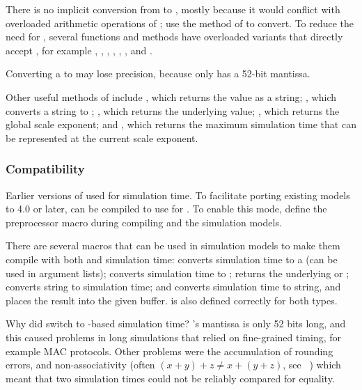 There is no implicit conversion from  to , mostly
because it would conflict with overloaded arithmetic operations of ;
use the  method of  to convert. To reduce the
need for , several functions and methods have overloaded variants
that directly accept , for example , ,
, , , , and
.

\begin{note}
   Converting a  to  may lose precision, because
    only has a 52-bit mantissa.
\end{note}

Other useful methods of  include ,
which returns the value as a string; , which converts a
string to ; , which returns the
underlying  value; , which returns the
global scale exponent; and , which returns the
maximum simulation time that can be represented at the current
scale exponent.

\subsubsection{Compatibility}

Earlier versions of {\opp} used  for simulation time. To facilitate
porting existing models to {\opp} 4.0 or later, {\opp} can be compiled to use
 for . To enable this mode, define the
 preprocessor macro during compiling {\opp}
and the simulation models.

There are several macros that can be used in simulation models to make
them compile with both  and  simulation time:
 converts simulation time to a 
(can be used in  argument lists);
 converts simulation time to ;
 returns the underlying  or ;
 converts string to simulation time; and
 converts simulation time to string,
and places the result into the given buffer.  is
also defined correctly for both  types.

\begin{note}
   Why did {\opp} switch to -based simulation time?
   's mantissa is only 52 bits long, and this caused
   problems in long simulations that relied on fine-grained timing,
   for example MAC protocols. Other problems were the accumulation of
   rounding errors, and non-associativity (often $(x+y)+z \neq x+(y+z)$, see
   ~\cite{Goldberg91what}) which meant that two  simulation
   times could not be reliably compared for equality.
\end{note}


